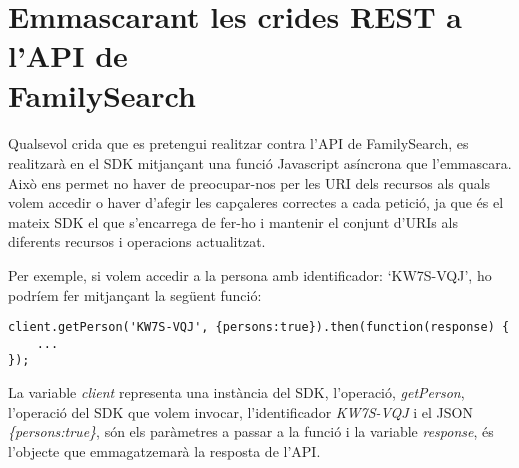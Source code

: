 \section{Emmascarant les crides REST a l'API de\\Family\-Search}

    \paragraph{}
    Qualsevol crida que es pretengui realitzar contra l’API de FamilySearch, es re\-a\-lit\-za\-rà en el SDK mitjançant una funció Javascript asíncrona que l'emmascara. Això ens permet no haver de preocupar-nos per les URI dels recursos als quals volem accedir o haver d'afegir les capçaleres correctes a cada petició, ja que és el mateix SDK el que s'encarrega de fer-ho i mantenir el conjunt d'URIs als diferents recursos i operacions actualitzat.

    Per exemple, si volem accedir a la persona amb identificador: `KW7S-VQJ', ho podríem fer mitjançant la següent funció:

\begin{lstlisting}[style=rawOwn,caption={Exempla crida emmascarada a l'API de FamilySearch}]
client.getPerson('KW7S-VQJ', {persons:true}).then(function(response) {
    ...
});
\end{lstlisting}

    La variable \emph{client} representa una instància del SDK, l’operació, \emph{getPerson}, l’ope\-ra\-ció del SDK que volem invocar, l’identificador \emph{KW7S-VQJ} i el JSON \emph{\{persons:true\}}, són els paràmetres a passar a la funció i la variable \emph{response}, és l’objecte que emmagatzemarà la resposta de l’API.
